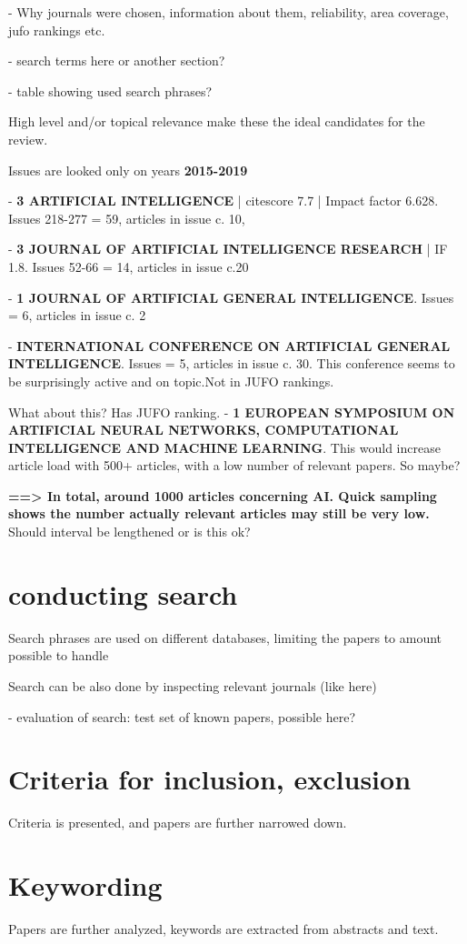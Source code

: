 \documentclass[utf8,english]{gradu3}
\begin{document}
- Why journals were chosen, information about them, reliability, area coverage,
jufo rankings etc.

- search terms here or another section? 

- table showing used search phrases?

High level and/or topical relevance make these the ideal candidates for the review.

Issues are looked only on years \textbf{2015-2019}

- \textbf{3 ARTIFICIAL INTELLIGENCE} | citescore 7.7 | Impact factor 6.628.
  Issues 218-277 = 59, articles in issue c. 10,

- \textbf{3 JOURNAL OF ARTIFICIAL INTELLIGENCE RESEARCH} | IF 1.8.
  Issues 52-66 = 14, articles in issue c.20

- \textbf{1 JOURNAL OF ARTIFICIAL GENERAL INTELLIGENCE}.
  Issues = 6, articles in issue c. 2

- \textbf{INTERNATIONAL CONFERENCE ON ARTIFICIAL GENERAL INTELLIGENCE}.
  Issues = 5, articles in issue c. 30. This conference seems to be surprisingly active and on topic.Not in JUFO rankings.
  
  What about this? Has JUFO ranking.
- \textbf{1 EUROPEAN SYMPOSIUM ON ARTIFICIAL NEURAL NETWORKS, COMPUTATIONAL INTELLIGENCE AND MACHINE LEARNING}.
  This would increase article load with 500+ articles, with a low number of relevant papers. So maybe?


  \textbf{==> In total, around 1000 articles concerning AI. 
  Quick sampling shows the number actually relevant articles may still be very low.} Should interval be lengthened or is this ok?
  

\section{conducting search}
Search phrases are used on different databases, limiting the papers to amount
possible to handle

Search can be also done by inspecting relevant journals (like here)

- evaluation of search: test set of known papers, possible here?

\section{Criteria for inclusion, exclusion}
Criteria is presented, and papers are further narrowed down.

\section{Keywording}
Papers are further analyzed, keywords are extracted from abstracts and text. 
\end{document}
